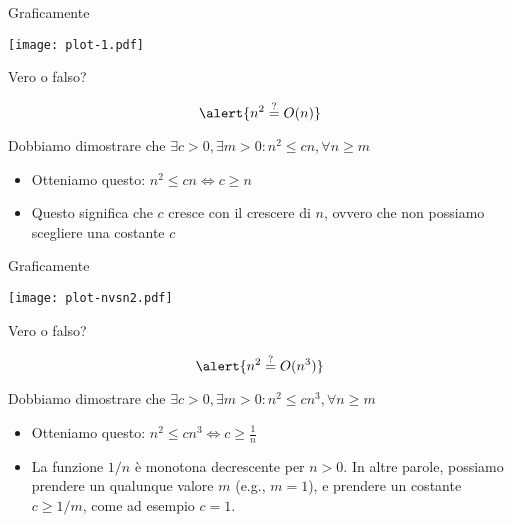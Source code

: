 \begin{frame}{Graficamente}

\begin{center}
\vspace{-12pt}
\texttt{[image: plot-1.pdf]}
\end{center}

\end{frame}

\begin{frame}{Vero o falso?}
  
\begin{exampleblock}{}
\[ 
  \alert{n^2 \stackrel{?}{=} O(n)}
\]
\end{exampleblock}

\bigskip
Dobbiamo dimostrare che $\exists c>0, \exists m>0: n^2 \leq cn, \forall n \geq m$

\begin{itemize}
\item Otteniamo questo: $n^2 \leq cn \Leftrightarrow c \geq n$
\item Questo significa che $c$ cresce con il crescere di $n$, ovvero che non 
possiamo scegliere una costante $c$ 
\end{itemize}

\end{frame}

\begin{frame}{Graficamente}

\begin{center}
\vspace{-12pt}
\texttt{[image: plot-nvsn2.pdf]}
\end{center}

\end{frame}

\begin{frame}{Vero o falso?}

\begin{exampleblock}{}
\[
  \alert{n^2 \stackrel{?}{=} O(n^3)}
\]
\end{exampleblock}

\bigskip
Dobbiamo dimostrare che $\exists c>0, \exists m>0: n^2 \leq cn^3, \forall n \geq m$

\begin{itemize}
\item Otteniamo questo: $n^2 \leq cn^3 \Leftrightarrow c \geq \frac{1}{n}$
\item La funzione $1/n$ è monotona decrescente per $n>0$. In altre parole,
possiamo prendere un qualunque valore $m$ (e.g., $m=1$), e prendere un costante $c \geq 1/m$, come ad esempio $c=1$.
\end{itemize}

\end{frame}

